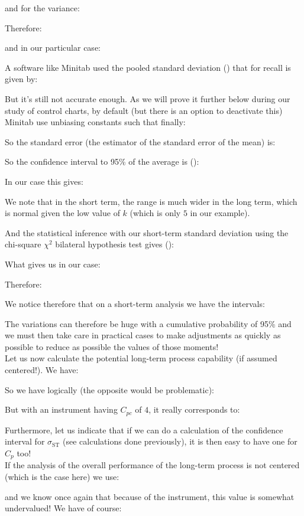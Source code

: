 	\pagebreak
	\begin{tcolorbox}[colframe=black,colback=white,sharp corners]
	and for the variance:
		
	Therefore:
	
	and in our particular case:
	
	\begin{tcolorbox}[title=Remark,colframe=black,arc=10pt]
	A software like Minitab used the pooled standard deviation () that for recall is given by:
	
	But it's still not accurate enough. As we will prove it further below during our study of control charts, by default (but there is an option to deactivate this) Minitab use unbiasing constants such that finally:
	
	\end{tcolorbox}
	So the standard error (the estimator of the standard error of the mean) is:
	
	So the confidence interval to 95\% of the average is ():
	
	In our case this gives:
	
	We note that in the short term, the range is much wider in the long term, which is normal given the low value of $k$ (which is only $5$ in our example).
	\end{tcolorbox}
	
	\pagebreak
	\begin{tcolorbox}[colframe=black,colback=white,sharp corners]
	And the statistical inference with our short-term standard deviation using the chi-square $\chi^2$ bilateral hypothesis test gives ():
	
	What gives us in our case:
	
	Therefore:
	
	We notice therefore that on a short-term analysis we have the intervals:
	 
	The variations can therefore be huge with a cumulative probability of 95\% and we must then take care in practical cases to make adjustments as quickly as possible to reduce as possible the values of those moments!\\
		
	Let us now calculate the potential long-term process capability (if assumed centered!).
	We have:
	
	So we have logically (the opposite would be problematic):
	
	But with an instrument having $C_{pc}$ of $4$, it really corresponds to:
	
	Furthermore, let us indicate that if we can do a calculation of the confidence interval for $\sigma_{\text{ST}}$ (see calculations done previously), it is then easy to have one for $C_p$ too!\\
	
	If the analysis of the overall performance of the long-term process is not centered (which is the case here)  we use:
		
	and we know once again that because of the instrument, this value is somewhat undervalued! We have of course:
	\end{tcolorbox}
	
